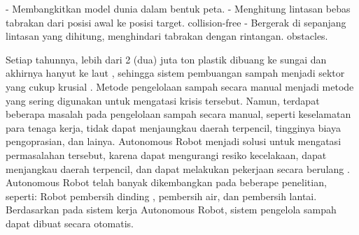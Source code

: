  
- Membangkitkan model dunia dalam bentuk peta.
- Menghitung lintasan bebas tabrakan dari posisi awal ke posisi target. collision-free 
- Bergerak di sepanjang lintasan yang dihitung, menghindari tabrakan dengan rintangan. obstacles.
\cite{Rubio2019a}
 
 
 
 
 
 
 
 Setiap tahunnya, lebih dari 2 (dua) juta ton plastik dibuang ke sungai dan akhirnya hanyut ke laut \cite{Othman2020}, 
 sehingga sistem pembuangan sampah menjadi sektor yang cukup krusial \cite{Othman2020}\cite{Hossain2019}. 
 Metode pengelolaan sampah secara manual menjadi metode yang sering digunakan untuk mengatasi krisis tersebut\cite{Khan2020}. 
 Namun, terdapat beberapa masalah pada pengelolaan sampah secara manual, seperti keselamatan para tenaga kerja, tidak dapat menjaungkau daerah terpencil, tingginya biaya pengoprasian, dan lainya\cite{Khan2020}. 
 Autonomous Robot menjadi solusi untuk mengatasi permasalahan tersebut, karena dapat mengurangi resiko kecelakaan, dapat menjangkau daerah terpencil, dan dapat melakukan pekerjaan secara berulang \cite{Khan2020, Bai2018}. Autonomous Robot telah banyak dikembangkan pada beberape penelitian, seperti: Robot pembersih dinding \cite{HouxiangZhang2006}, pembersih air\cite{Yuan2011}, dan pembersih lantai\cite{Bai2018, Kang2014, Palacin2004}. Berdasarkan pada sistem kerja Autonomous Robot, sistem pengelola sampah dapat dibuat secara otomatis\cite{Bai2018, Nagayo2019, Prasetyo2020}.
 
